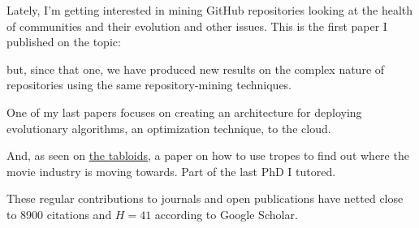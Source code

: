 \documentclass[]{friggeri-jj-cv}
\begin{document}
\cite{2014arXiv1403.3084G}

Lately, I'm getting interested in mining GitHub repositories looking
at the health of communities and their evolution and other
issues. This is the first paper I published on the topic:

\cite{2016arXiv160107862M}

but, since that one, we have produced new results on the complex
nature of repositories using the same repository-mining techniques.

One of my last papers focuses on creating an architecture for
deploying evolutionary algorithms, an optimization technique, to the
cloud.

\cite{GARCIAVALDEZ2021234}

And, as seen on
\href{https://www.dailymail.co.uk/sciencetech/article-9423885/COMPUTERS-soon-write-film-scripts-analysing-popular-movie-tropes.html}{the
  tabloids}, a paper on how to use tropes to find out where the movie
industry is moving towards. Part of the last PhD I tutored.

\cite{10.1371/journal.pone.0248881}

These regular contributions to journals and open publications have
netted close to 8900 citations  and $H=41$ according to Google Scholar.

\end{document}
